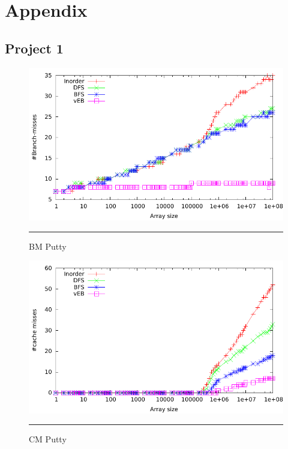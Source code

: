 
\chapter{Appendix} %

\label{AppendixA} %

\section{Project 1}
\begin{figure}[htbp]
	\centering
		\includegraphics[width=\textwidth]{./Appendices/Figures/Project1/Branch_misses-Putty.pdf}
		\rule{35em}{0.5pt}
	\caption[Branch misses]{
	BM Putty
	}
	\label{fig:Branch_misses_p1putty}
\end{figure}
\begin{figure}[htbp]
	\centering
		\includegraphics[width=\textwidth]{./Appendices/Figures/Project1/Cache_misses-putty.pdf}
		\rule{35em}{0.5pt}
	\caption[Cache misses]{
	CM Putty
	}
	\label{fig:Cache_misses_p1putty}
\end{figure}

